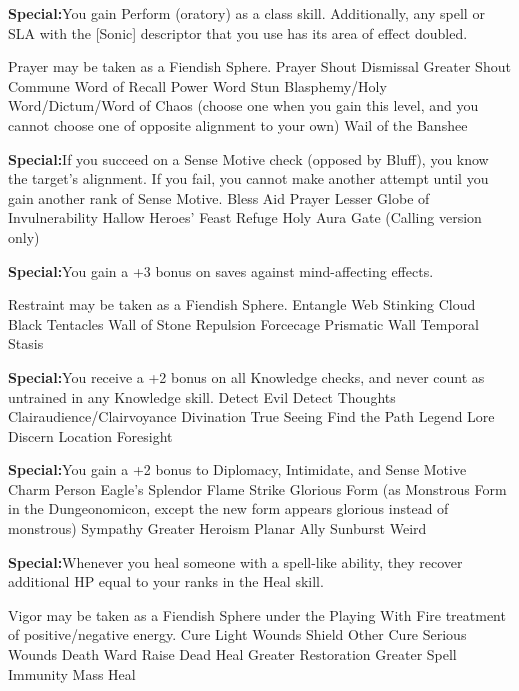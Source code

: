 \textbf{Special:}{You gain Perform (oratory) as a class skill. Additionally, any spell or SLA with the [Sonic] descriptor that you use has its area of effect doubled.}

Prayer may be taken as a Fiendish Sphere.
\sphere
{Prayer}
{Shout}
{Dismissal}
{Greater Shout}
{Commune}
{Word of Recall}
{Power Word Stun}
{Blasphemy/Holy Word/Dictum/Word of Chaos (choose one when you gain this level, and you cannot choose one of opposite alignment to your own)}
{Wail of the Banshee}

\textbf{Special:}{If you succeed on a Sense Motive check (opposed by Bluff), you know the target's alignment. If you fail, you cannot make another attempt until you gain another rank of Sense Motive.}
\sphere
{Bless}
{Aid}
{Prayer}
{Lesser Globe of Invulnerability}
{Hallow}
{Heroes' Feast}
{Refuge}
{Holy Aura}
{Gate (Calling version only)}

\textbf{Special:}{You gain a +3 bonus on saves against mind-affecting effects.}

Restraint may be taken as a Fiendish Sphere.
\sphere
{Entangle}
{Web}
{Stinking Cloud}
{Black Tentacles}
{Wall of Stone}
{Repulsion}
{Forcecage}
{Prismatic Wall}
{Temporal Stasis}

\textbf{Special:}{You receive a +2 bonus on all Knowledge checks, and never count as untrained in any Knowledge skill.}
\sphere
{Detect Evil}
{Detect Thoughts}
{Clairaudience/Clairvoyance}
{Divination}
{True Seeing}
{Find the Path}
{Legend Lore}
{Discern Location}
{Foresight}

\textbf{Special:}{You gain a +2 bonus to Diplomacy, Intimidate, and Sense Motive}
\sphere
{Charm Person}
{Eagle's Splendor}
{Flame Strike}
{Glorious Form (as Monstrous Form in the Dungeonomicon, except the new form appears glorious instead of monstrous)}
{Sympathy}
{Greater Heroism}
{Planar Ally}
{Sunburst}
{Weird}

\textbf{Special:}{Whenever you heal someone with a spell-like ability, they recover additional HP equal to your ranks in the Heal skill.}

Vigor may be taken as a Fiendish Sphere under the Playing With Fire treatment of positive/negative energy.
\sphere
{Cure Light Wounds}
{Shield Other}
{Cure Serious Wounds}
{Death Ward}
{Raise Dead}
{Heal}
{Greater Restoration}
{Greater Spell Immunity}
{Mass Heal}
